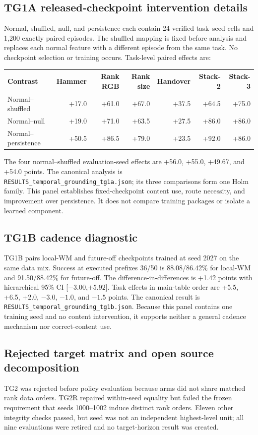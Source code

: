 \subsection{TG1A released-checkpoint intervention details}
Normal, shuffled, null, and persistence each contain 24 verified task--seed
cells and 1,200 exactly paired episodes.  The shuffled mapping is fixed before
analysis and replaces each normal feature with a different episode from the
same task.  No checkpoint selection or training occurs.  Task-level paired
effects are:
\begin{center}\small
\begin{tabular}{lrrrrrr}
\toprule
Contrast & Hammer & Rank RGB & Rank size & Handover & Stack-2 & Stack-3 \\
\midrule
Normal--shuffled & +17.0 & +61.0 & +67.0 & +37.5 & +64.5 & +75.0 \\
Normal--null & +19.0 & +71.0 & +63.5 & +27.5 & +86.0 & +86.0 \\
Normal--persistence & +50.5 & +86.5 & +79.0 & +23.5 & +92.0 & +86.0 \\
\bottomrule
\end{tabular}
\end{center}
The four normal--shuffled evaluation-seed effects are +56.0, +55.0, +49.67,
and +54.0 points.  The canonical analysis is
\texttt{RESULTS\_temporal\_grounding\_tg1a.json}; its three comparisons form
one Holm family.  This panel establishes fixed-checkpoint content use, route
necessity, and improvement over persistence.  It does not compare training
packages or isolate a learned component.

\subsection{TG1B cadence diagnostic}
TG1B pairs local-WM and future-off checkpoints trained at seed 2027 on the same
data mix.  Success at executed prefixes 36/50 is 88.08/86.42\% for local-WM
and 91.50/88.42\% for future-off.  The difference-in-differences is +1.42
points with hierarchical 95\% CI [$-3.00$,$+5.92$].  Task effects in main-table
order are +5.5, +6.5, +2.0, $-3.0$, $-1.0$, and $-1.5$ points.  The canonical
result is \texttt{RESULTS\_temporal\_grounding\_tg1b.json}.  Because this panel
contains one training seed and no content intervention, it supports neither a
general cadence mechanism nor correct-content use.

\subsection{Rejected target matrix and open source decomposition}
TG2 was rejected before policy evaluation because arms did not share matched
rank data orders.  TG2R repaired within-seed equality but failed the frozen
requirement that seeds 1000--1002 induce distinct rank orders.  Eleven other
integrity checks passed, but seed was not an independent highest-level unit;
all nine evaluations were retired and no target-horizon result was created.

